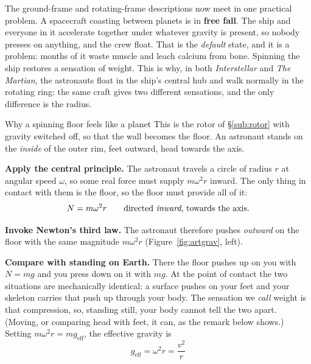 The ground-frame and rotating-frame descriptions now meet in one practical problem. A spacecraft coasting between planets is in \textbf{free fall}. The ship and everyone in it accelerate
together under whatever gravity is present, so nobody presses on anything, and the crew float. That is
the \emph{default} state, and it is a problem: months of it waste muscle and leach calcium from bone.
Spinning the ship restores a sensation of weight. This is why, in both \emph{Interstellar} and \emph{The Martian}, the astronauts float in the
ship's central hub and walk normally in the rotating ring: the same craft gives two different
sensations, and the only difference is the radius.


\begin{derivbox}{Why a spinning floor feels like a planet}
This is the rotor of \S\ref{sub:rotor} with gravity switched off, so that the wall becomes the floor. An astronaut
stands on the \emph{inside} of the outer rim, feet outward, head towards the axis.

 \textbf{Apply the central principle.} The astronaut travels a circle of radius $r$ at angular
speed $\omega$, so some real force must supply $m\omega^{2}r$ inward. The only thing in contact with
them is the floor, so the floor must provide all of it:
\[
N=m\omega^{2}r \qquad\text{directed \emph{inward}, towards the axis.}
\]

 \textbf{Invoke Newton's third law.} The astronaut therefore pushes \emph{outward} on the floor
with the same magnitude $m\omega^{2}r$ (Figure~\ref{fig:artgrav}, left).

 \textbf{Compare with standing on Earth.} There the floor pushes up on you with $N=mg$ and you
press down on it with $mg$. At the point of contact the two situations are mechanically identical: a
surface pushes on your feet and your skeleton carries that push up through your body. The sensation we
\emph{call} weight is that compression, so, standing still, your body cannot tell the two apart.
(Moving, or comparing head with feet, it can, as the remark below shows.) Setting $m\omega^{2}r=mg_{\text{eff}}$,
the effective gravity is
\[
\boxed{\;g_{\text{eff}}=\omega^{2}r=\frac{v^{2}}{r}\;}
\]
\end{derivbox}


